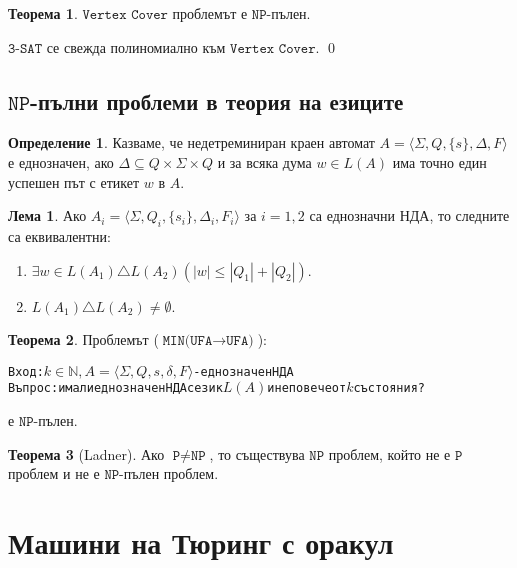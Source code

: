 \documentclass[a4paper]{article}
\theoremstyle{definition}
\newtheorem{theorem}{Теорема}
\newtheorem{lemma}{Лема}
\newtheorem{definition}{Определение}
\newenvironment{hint}{\noindent{\bf Упътване.}\hspace*{1em}}{\qed\par\vspace*{1em}}
\begin{document}
\begin{theorem}
  $\texttt{Vertex Cover}$ проблемът е $\texttt{NP}$-пълен.
\end{theorem}
\begin{hint}
  $\texttt{3-SAT}$ се свежда полиномиално към $\texttt{Vertex Cover}$.
\end{hint}


\subsection*{$\texttt{NP}$-пълни проблеми в теория на езиците}

\begin{definition}
Казваме, че недетреминиран краен автомат $A=\langle \Sigma,Q,\{s\},\Delta,F\rangle$ е еднозначен,
ако $\Delta\subseteq Q\times \Sigma\times Q$ и за всяка дума $w\in L(A)$ има точно един успешен път с етикет $w$ в $A$.
\end{definition}

\begin{lemma}
  Ако $A_i=\langle \Sigma,Q_i,\{s_i\},\Delta_i,F_i\rangle$ за $i=1,2$ са еднозначни НДА, то следните са еквивалентни:
  \begin{enumerate}
  \item $\exists w\in L(A_1)\triangle L(A_2) (|w|\le |Q_1|+|Q_2|)$.
  \item $L(A_1)\triangle L(A_2)\neq\emptyset$.
  \end{enumerate} 
\end{lemma}

\begin{theorem}
Проблемът ($\texttt{MIN(UFA}\rightarrow\texttt{UFA)}$):
\begin{alltt}
Вход: \(k\in\mathbb{N}, A=\langle\Sigma,Q,s,\delta,F\rangle\) - еднозначен НДА
Въпрос: има ли еднозначен НДА с език \(L(A)\) и не повече от \(k\) състояния?
\end{alltt}
е $\texttt{NP}$-пълен.
\end{theorem}

\begin{theorem}[Ladner]
  Ако $\texttt{P} \neq \texttt{NP}$, то съществува $\texttt{NP}$ проблем, който не е $\texttt{P}$ проблем и не е $\texttt{NP}$-пълен проблем.
\end{theorem}

\section{Машини на Тюринг с оракул}
\end{document}
